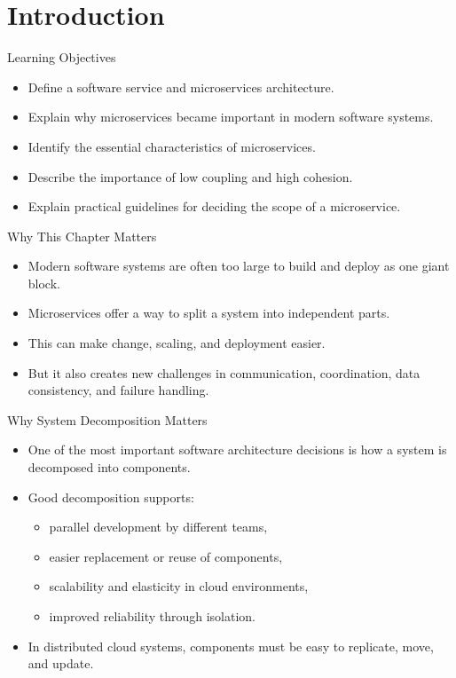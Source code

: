\section{Introduction}

\begin{frame}{Learning Objectives}
\begin{itemize}
    \item Define a software service and microservices architecture.
    \item Explain why microservices became important in modern software systems.
    \item Identify the essential characteristics of microservices.
    \item Describe the importance of low coupling and high cohesion.
    \item Explain practical guidelines for deciding the scope of a microservice.
\end{itemize}
\end{frame}


\begin{frame}{Why This Chapter Matters}
\begin{itemize}
    \item Modern software systems are often too large to build and deploy as one giant block.
    \item Microservices offer a way to split a system into independent parts.
    \item This can make change, scaling, and deployment easier.
    \item But it also creates new challenges in communication, coordination, data consistency, and failure handling.
\end{itemize}
\end{frame}



\begin{frame}{Why System Decomposition Matters}
\begin{itemize}
    \item One of the most important software architecture decisions is how a system is decomposed into components.
    \item Good decomposition supports:
    \begin{itemize}
        \item parallel development by different teams,
        \item easier replacement or reuse of components,
        \item scalability and elasticity in cloud environments,
        \item improved reliability through isolation.
    \end{itemize}
    \item In distributed cloud systems, components must be easy to replicate, move, and update.
\end{itemize}
\end{frame}

